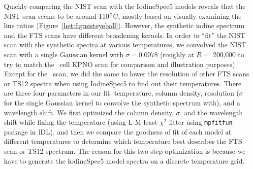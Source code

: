 Quickly comparing the NIST scan with the IodineSpec5 models reveals
that the NIST scan seems to be around 110$^{\circ}$C, mostly based on
visually examining the line ratios
(Figure~\ref{het:fig:nisteyeball}). However, the synthetic iodine
spectrum and the FTS scans have different broadening kernels. In order
to ``fit'' the NIST scan with the synthetic spectra at various
temperatures, we convolved the NIST scan with a single Gaussian kernel
with $\sigma=0.0078$ (roughly at $R=$ 200,000 to try to match the
\keck\ cell KPNO scan for comparison and illustration
purposes). Except for the \keck\ scan, we did the same to lower the
resolution of other FTS scans or TS12 spectra when using IodineSpec5
to find out their temperatures. There are three four parameters in our
fit: temperature, column density, resolution ($\sigma$ for the single
Gaussian kernel to convolve the synthetic spectrum with), and a
wavelength shift. We first optimized the column density, $\sigma$, and
the wavelength shift while fixing the temperature (using L-M
least-$\chi^2$ fitter using {\tt mpfitfun} package in IDL), and then
we compare the goodness of fit of each model at different temperatures
to determine which temperature best describes the FTS scan or TS12
spectrum. The reason for this two-step optimization is because we have
to generate the IodineSpec5 model spectra on a discrete temperature
grid.


